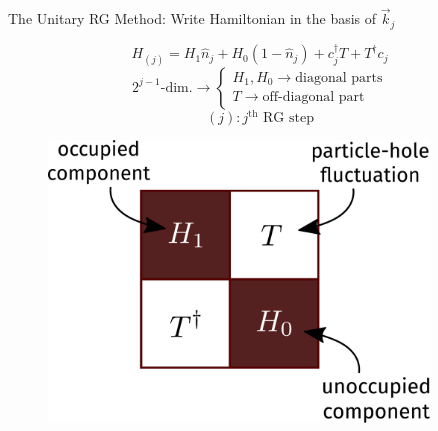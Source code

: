 \documentclass[10pt,aspectratio=169]{beamer}
\begin{document}
\begin{frame}[noframenumbering]{The Unitary RG Method: Write Hamiltonian in the basis of \(\vec k_j\)}
\vspace*{-20pt}
\vspace*{\fill}

\begin{minipage}{0.4\textwidth}
	\vspace*{-30pt}
	\[H_{(j)} = H_1 \hat n_j + H_0 \left(1 - \hat n_j\right) + c^\dagger_j T + T^\dagger c_j\]
\[
 {2^{j-1} \text{-dim.}} \longrightarrow \begin{cases}
	H_1, H_0 \longrightarrow \text{diagonal parts}\\
T \longrightarrow \text{off-diagonal part}
\end{cases}
\]
\[ (j) : j^\text{th} \text{ RG step}\]
\end{minipage}
\hspace*{\fill}
\begin{minipage}{0.5\textwidth}
\begin{figure}
	\includegraphics[width=0.9\textwidth]{figures/urg_ham.pdf}
\end{figure}
\end{minipage}
\end{frame}
\end{document}
